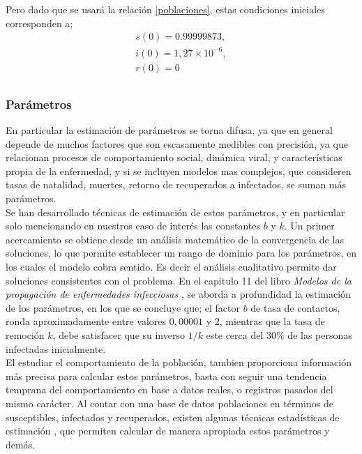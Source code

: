 \documentclass[journal]{IEEEtran}
\begin{document}
Pero dado que se usará la relación \ref{poblaciones}, estas condiciones iniciales corresponden a;
\begin{equation}
	\begin{split}
		s(0) = 0. 99999873,\\
		i(0) = 1, 27 \times 10^{-6},\\
		r(0) = 0\\
	\end{split}
\end{equation}

\subsubsection{Parámetros}
En particular la estimación de parámetros se torna difusa,
ya que en general depende de muchos factores que son escasamente medibles
con precisión, ya que relacionan procesos de comportamiento social, dinámica viral,
y características propia de la enfermedad, y si se incluyen modelos mas complejos,
que consideren tasas de natalidad, muertes, retorno de recuperados a infectados,
se suman más parámetros.\\

Se han desarrollado técnicas de estimación de estos parámetros, y en particular solo mencionando
en nuestros caso de interés las constantes $b$ y $k$. Un primer acercamiento se obtiene
desde un análisis matemático de la convergencia de las soluciones, lo que permite establecer
un rango de dominio para los parámetros, en los cuales el modelo cobra sentido. Es decir
el análisis cualitativo permite dar soluciones consistentes con el problema. En el capitulo 11
del libro \textit{Modelos de la propagación de enfermedades infecciosas} \cite{Modelos de propagacion
}, se aborda a profundidad la estimación de los parámetros, en los que se concluye que;
el factor $b$ de tasa de contactos, ronda aproximadamente entre valores $0,00001$ y $2$, mientras que la tasa de remoción
$k$, debe satisfacer que su inverso $1/k$ este cerca del $30\%$ de las personas infectadas inicialmente.\\

El estudiar el comportamiento de la población, tambien proporciona información más precisa para
calcular estos parámetros, basta con seguir una tendencia temprana del comportamiento en base a datos
reales, o registros pasados del mismo carácter. Al contar con una base de datos poblaciones en términos de susceptibles, infectados
y recuperados, existen algunas técnicas estadísticas de estimación \cite{Modelos de propagacion}, que permiten calcular de manera apropiada
estos parámetros y demás.\\
\end{document}
